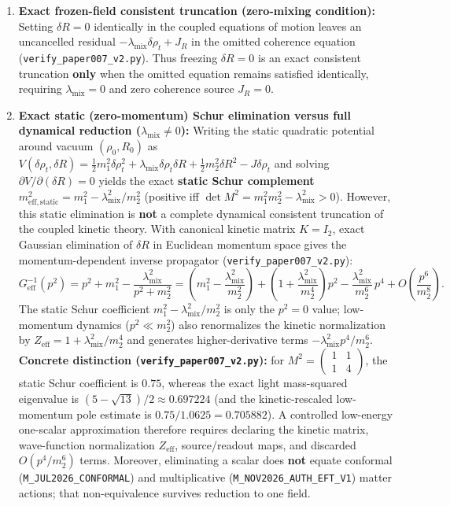 \documentclass[
  american,
  11pt,
  letterpaper,
]{article}
\providecommand{\tightlist}{%
  \setlength{\itemsep}{0pt}\setlength{\parskip}{0pt}}
\begin{document}
\begin{enumerate}
\def\labelenumi{\arabic{enumi}.}
\tightlist
\item
  \textbf{Exact frozen-field consistent truncation (zero-mixing condition):} Setting \(\delta R = 0\) identically in the coupled equations of motion leaves an uncancelled residual \(-\lambda_{\mathrm{mix}}\delta\rho_t + J_R\) in the omitted coherence equation (\nolinkurl{verify_paper007_v2.py}). Thus freezing \(\delta R = 0\) is an exact consistent truncation \textbf{only} when the omitted equation remains satisfied identically, requiring \(\lambda_{\mathrm{mix}} = 0\) and zero coherence source \(J_R = 0\).
\item
  \textbf{Exact static (zero-momentum) Schur elimination versus full dynamical reduction (\(\lambda_{\mathrm{mix}} \neq 0\)):} Writing the static quadratic potential around vacuum \((\rho_0, R_0)\) as \(V(\delta\rho_t, \delta R) = \frac{1}{2} m_1^2 \delta\rho_t^2 + \lambda_{\mathrm{mix}} \delta\rho_t \delta R + \frac{1}{2} m_2^2 \delta R^2 - J \delta\rho_t\) and solving \(\partial V / \partial(\delta R) = 0\) yields the exact \textbf{static Schur complement} \(m_{\mathrm{eff,static}}^2 = m_1^2 - \lambda_{\mathrm{mix}}^2/m_2^2\) (positive iff \(\det M^2 = m_1^2 m_2^2 - \lambda_{\mathrm{mix}}^2 > 0\)). However, this static elimination is \textbf{not} a complete dynamical consistent truncation of the coupled kinetic theory. With canonical kinetic matrix \(K = I_2\), exact Gaussian elimination of \(\delta R\) in Euclidean momentum space gives the momentum-dependent inverse propagator (\nolinkurl{verify_paper007_v2.py}): \begin{equation}
G_{\mathrm{eff}}^{-1}(p^2) = p^2 + m_1^2 - \frac{\lambda_{\mathrm{mix}}^2}{p^2 + m_2^2}
  = \left(m_1^2 - \frac{\lambda_{\mathrm{mix}}^2}{m_2^2}\right)
  + \left(1 + \frac{\lambda_{\mathrm{mix}}^2}{m_2^4}\right) p^2
  - \frac{\lambda_{\mathrm{mix}}^2}{m_2^6}\,p^4 + O\!\left(\frac{p^6}{m_2^8}\right).
\end{equation} The static Schur coefficient \(m_1^2 - \lambda_{\mathrm{mix}}^2/m_2^2\) is only the \(p^2 = 0\) value; low-momentum dynamics (\(p^2 \ll m_2^2\)) also renormalizes the kinetic normalization by \(Z_{\mathrm{eff}} = 1 + \lambda_{\mathrm{mix}}^2/m_2^4\) and generates higher-derivative terms \(-\lambda_{\mathrm{mix}}^2 p^4 / m_2^6\). \textbf{Concrete distinction (\nolinkurl{verify_paper007_v2.py}):} for \(M^2 = \begin{pmatrix} 1 & 1 \\ 1 & 4 \end{pmatrix}\), the static Schur coefficient is \(0.75\), whereas the exact light mass-squared eigenvalue is \((5 - \sqrt{13})/2 \approx 0.697224\) (and the kinetic-rescaled low-momentum pole estimate is \(0.75/1.0625 = 0.705882\)). A controlled low-energy one-scalar approximation therefore requires declaring the kinetic matrix, wave-function normalization \(Z_{\mathrm{eff}}\), source/readout maps, and discarded \(O(p^4/m_2^6)\) terms. Moreover, eliminating a scalar does \textbf{not} equate conformal (\nolinkurl{M_JUL2026_CONFORMAL}) and multiplicative (\nolinkurl{M_NOV2026_AUTH_EFT_V1}) matter actions; that non-equivalence survives reduction to one field.
\end{enumerate}
\end{document}
